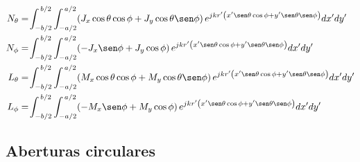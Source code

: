 \begin{subequations}
\label{grup_ec_fundamentos:4}
\begin{align}
N_{\theta} &= \!\int_{-b/2}^{\,b/2}\int_{-a/2}^{\,a/2}\!\left(J_x\cos\theta\cos\phi + J_y\cos\theta\sen\phi\right)e^{jkr'\left(x'\sen\theta\cos\phi + y'\sen\theta\sen\phi\right)}dx'dy'
\label{ec_fundamentos:58}\\
N_{\phi} &= \!\int_{-b/2}^{\,b/2}\int_{-a/2}^{\,a/2}\!\left(- J_x\sen\phi + J_y\cos\phi\right)e^{jkr'\left(x'\sen\theta\cos\phi + y'\sen\theta\sen\phi\right)}dx'dy'
\label{ec_fundamentos:59}\\
L_{\theta} &= \!\int_{-b/2}^{\,b/2}\int_{-a/2}^{\,a/2}\!\left(M_x\cos\theta\cos\phi + M_y\cos\theta\sen\phi\right)e^{jkr'\left(x'\sen\theta\cos\phi + y'\sen\theta\sen\phi\right)}dx'dy'
\label{ec_fundamentos:60}\\
L_{\phi} &= \!\int_{-b/2}^{\,b/2}\int_{-a/2}^{\,a/2}\!\left(- M_x\sen\phi + M_y\cos\phi\right)e^{jkr'\left(x'\sen\theta\cos\phi + y'\sen\theta\sen\phi\right)}dx'dy'
\label{ec_fundamentos:61}
\end{align}
\end{subequations}

\subsection{Aberturas circulares}
\label{sec_fundamentos_aber_circ}


